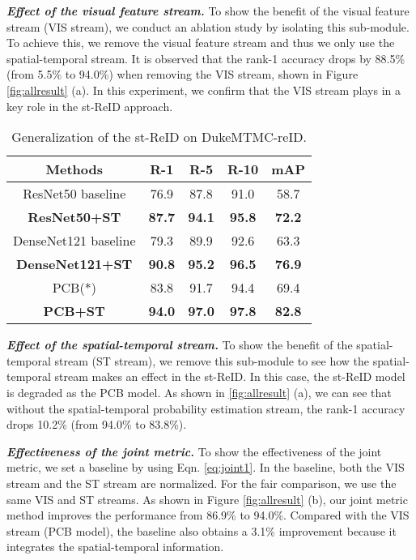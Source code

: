 \documentclass[letterpaper]{article} \usepackage{aaai19}  \usepackage{times}  \usepackage{helvet}  \usepackage{courier}  \usepackage{url}  \usepackage{graphicx}  \usepackage{subfig}
\begin{document}
\textbf{\emph{Effect of the visual feature stream.}} To show the benefit of the visual feature stream (VIS stream), we conduct an ablation study by isolating this sub-module. To achieve this, we remove the visual feature stream and thus we only use the spatial-temporal stream. It is observed that the rank-1 accuracy drops by 88.5\% (from 5.5\% to 94.0\%) when removing the VIS stream, shown in Figure \ref{fig:allresult} (a). In this experiment, we confirm that the VIS stream plays in a key role in the st-ReID approach.
\begin{table}
\begin{center}
\begin{tabular}{c|c|c|c|c}
\hline
Methods &R-1&R-5&R-10&mAP \\
\hline
ResNet50 baseline &76.9&87.8&91.0&58.7\\
\textbf{ResNet50+ST}&\textbf{87.7}&\textbf{94.1}&\textbf{95.8}&\textbf{72.2}\\
\hline
DenseNet121 baseline &79.3&89.9&92.6&63.3\\
\textbf{DenseNet121+ST}&\textbf{90.8}&\textbf{95.2}&\textbf{96.5}&\textbf{76.9}\\
\hline
PCB(*) &83.8&91.7&94.4&69.4\\
\textbf{PCB+ST}&\textbf{94.0}&\textbf{97.0}&\textbf{97.8}&\textbf{82.8}\\
\hline
\end{tabular}
\end{center}
\caption{Generalization of the st-ReID on DukeMTMC-reID.}\label{tab:generalization}
\end{table}

\textbf{\emph{Effect of the spatial-temporal stream.}} To show the benefit of the spatial-temporal stream (ST stream), we remove this sub-module to see how the spatial-temporal stream makes an effect in the st-ReID. In this case, the st-ReID model is degraded as the PCB model. As shown in \ref{fig:allresult} (a), we can see that without the spatial-temporal probability estimation stream, the rank-1 accuracy drops 10.2\% (from 94.0\% to 83.8\%).

\textbf{\emph{Effectiveness of the joint metric.}} To show the effectiveness of the joint metric, we set a baseline by using Eqn. \ref{eq:joint1}. In the baseline, both the VIS stream and the ST stream are normalized. For the fair comparison, we use the same VIS and ST streams. As shown in Figure \ref{fig:allresult} (b), our joint metric method improves the performance from 86.9\% to 94.0\%. Compared with the VIS stream (PCB model), the baseline also obtains a 3.1\% improvement because it integrates the spatial-temporal information.
\end{document}
